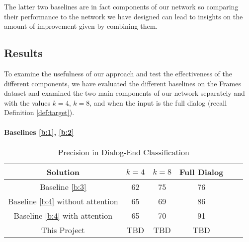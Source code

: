 The latter two baselines are in fact components 
of our network so comparing their performance to 
the network we have designed can lead to insights 
on the amount of improvement given by combining them. 


\subsection{Results}
To examine the usefulness of our approach and 
test the effectiveness of the different components, 
we have evaluated the different baselines on the Frames 
dataset \cite{frames} and examined the two main components of our network separately 
and with the values $k=4$, $k=8$, and when the input is the full dialog (recall Definition \ref{def:target}). 




\paragraph*{Baselines \ref{b:1}, \ref{b:2}}



\begin{table*}[!htb]
    \centering\small
    \begin{tabular}{| c | c | c | c | l | l |}
        \hline \textbf{Solution} & \textbf{$k=4$} & \textbf{$k=8$} & \textbf{Full Dialog} \\
        \hline Baseline \ref{b:3} & 62 & 75 & 76 \\
        \hline Baseline \ref{b:4} without attention  & 65 & 69 & 86 \\
        \hline Baseline \ref{b:4} with attention  & 65 & 70 & 91 \\
        \hline This Project & TBD & TBD & TBD \\
        \hline
    \end{tabular}
    \caption{Precision in Dialog-End Classification}\label{tbl:resComps}
\end{table*}


